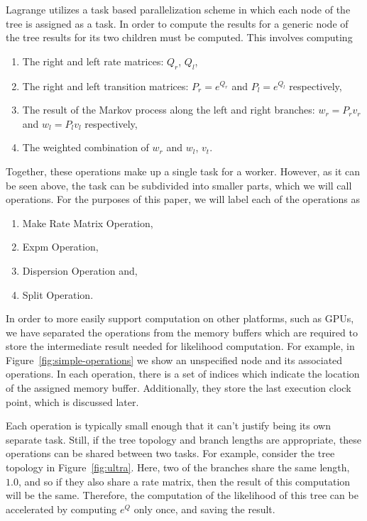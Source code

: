 \documentclass{article}
\begin{document}
Lagrange utilizes a task based parallelization scheme in which each node of the tree is assigned as a task. In order to
compute the results for a generic node of the tree results for its two children must be computed. This involves
computing
\begin{enumerate}
  \item The right and left rate matrices: $Q_r$, $Q_l$,
  \item The right and left transition matrices: $P_r = e^{Q_r}$ and $P_l = e^{Q_l}$ respectively,
  \item The result of the Markov process along the left and right branches: $w_r = P_r v_r$ and $w_l = P_l v_l$
    respectively,
  \item The weighted combination of $w_r$ and $w_l$, $v_t$.
\end{enumerate}
Together, these operations make up a single task for a worker. However, as it can be seen above, the task can be
subdivided into smaller parts, which we will call operations. For the purposes of this paper, we will label each of the
operations as
\begin{enumerate}
  \item Make Rate Matrix Operation,
  \item Expm Operation,
  \item Dispersion Operation and,
  \item Split Operation.
\end{enumerate}
In order to more easily support computation on other platforms, such as GPUs, we have separated the operations from the
memory buffers which are required to store the intermediate result needed for likelihood computation. For example, in
Figure~\ref{fig:simple-operations} we show an unspecified node and its associated operations. In each operation, there
is a set of indices which indicate the location of the assigned memory buffer. Additionally, they store the last
execution clock point, which is discussed later.

Each operation is typically small enough that it can't justify being its own separate task. Still, if the tree
topology and branch lengths are appropriate, these operations can be shared between two tasks. For example, consider the
tree topology in Figure~\ref{fig:ultra}. Here, two of the branches share the same length, $1.0$, and so if they also
share a rate matrix, then the result of this computation will be the same. Therefore, the computation of the likelihood
of this tree can be accelerated by computing $e^Q$ only once, and saving the result.
\end{document}

